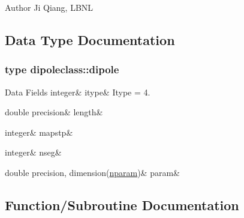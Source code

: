 \begin{DoxyAuthor}{Author}
Ji Qiang, L\+B\+NL 
\end{DoxyAuthor}


\subsection{Data Type Documentation}
\label{structdipoleclass_1_1dipole}
\subsubsection{type dipoleclass\+::dipole}
\begin{DoxyFields}{Data Fields}
\mbox{\label{namespacedipoleclass_a488890695ad6becc93db5079e740868e}} 
integer&
itype&
Itype = 4. \\
\hline

\mbox{\label{namespacedipoleclass_aada668e2b218b56769c64c2ec9f21dea}} 
double precision&
length&
\\
\hline

\mbox{\label{namespacedipoleclass_af0a1da636573d6878f6d1c11d0c9e5ab}} 
integer&
mapstp&
\\
\hline

\mbox{\label{namespacedipoleclass_a5f280e96dab020ba48b5b28f47b0d5fa}} 
integer&
nseg&
\\
\hline

\mbox{\label{namespacedipoleclass_a5ce0b668334f66ce50e3852ce17ddc39}} 
double precision, dimension(\mbox{\hyperlink{namespacedipoleclass_abc619199e1e9a2811da9e97630125da3}{nparam}})&
param&
\\
\hline

\end{DoxyFields}


\subsection{Function/\+Subroutine Documentation}
\mbox{\label{namespacedipoleclass_aecb437418e23046347e41045d2988d3b}} 
